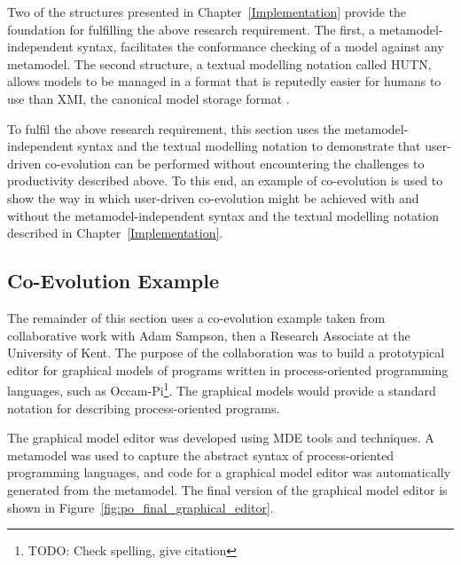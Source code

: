 Two of the structures presented in Chapter~\ref{Implementation} provide the foundation for fulfilling the above research requirement. The first, a metamodel-independent syntax, facilitates the conformance checking of a model against any metamodel. The second structure, a textual modelling notation called HUTN, allows models to be managed in a format that is reputedly easier for humans to use than XMI, the canonical model storage format \cite{hutn}.

To fulfil the above research requirement, this section uses the metamodel-independent syntax and the textual modelling notation to demonstrate that user-driven co-evolution can be performed without encountering the challenges to productivity described above. To this end, an example of co-evolution is used to show the way in which user-driven co-evolution might be achieved with and without the metamodel-independent syntax and the textual modelling notation described in Chapter~\ref{Implementation}.

\subsection{Co-Evolution Example}
The remainder of this section uses a co-evolution example taken from collaborative work with Adam Sampson, then a Research Associate at the University of Kent. The purpose of the collaboration was to build a prototypical editor for graphical models of programs written in process-oriented programming languages, such as Occam-Pi\footnote{TODO: Check spelling, give citation}. The graphical models would provide a standard notation for describing process-oriented programs.

The graphical model editor was developed using MDE tools and techniques. A metamodel was used to capture the abstract syntax of process-oriented programming languages, and code for a graphical model editor was automatically generated from the metamodel. The final version of the graphical model editor is shown in Figure~\ref{fig:po_final_graphical_editor}.

